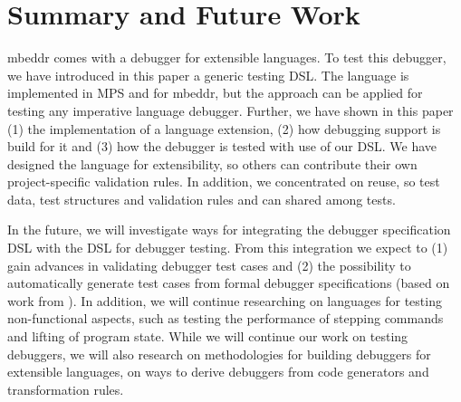 \section{Summary and Future Work}

mbeddr comes with a debugger for extensible languages. To test this debugger, we
have introduced in this paper a generic testing \ac{DSL}. The language is
implemented in \ac{MPS} and for mbeddr, but the approach can be applied for
testing any imperative language debugger. Further, we have shown in this paper 
(1) the implementation of a language extension, (2) how debugging support is
build for it and (3) how the debugger is tested with use of our \ac{DSL}. 
We have designed the language for
extensibility, so others can contribute their own project-specific validation
rules. In addition, we concentrated on reuse, so test data, test structures and
validation rules and can shared among tests.


In the future, we will investigate ways for integrating the debugger
specification \ac{DSL} with the \ac{DSL} for debugger testing. From this
integration we expect to (1) gain advances in validating debugger test cases and
(2) the possibility to automatically generate test cases from formal debugger 
specifications (based on work from \cite{conf/kbse/WuG05,henriques05}).
In addition, we will continue researching on languages for testing
non-functional aspects, such as testing the performance of stepping commands and
lifting of program state.
While we will continue our work on testing debuggers, we will also
research on methodologies for building debuggers for extensible
languages, \ie on ways to derive debuggers from code generators and
transformation rules.